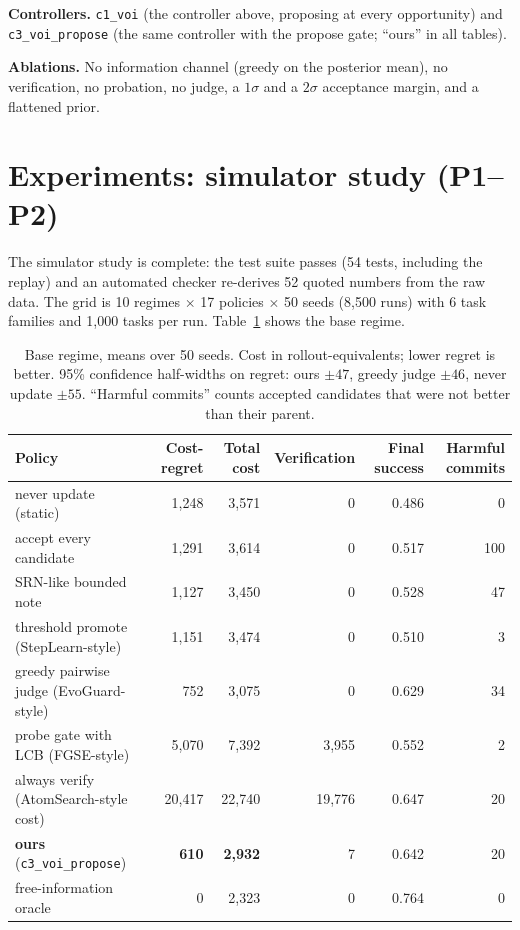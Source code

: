 \documentclass[11pt]{article}
\begin{document}
\textbf{Controllers.} \texttt{c1\_voi} (the controller above, proposing at every
opportunity) and \texttt{c3\_voi\_propose} (the same controller with the propose gate;
``ours'' in all tables).

\textbf{Ablations.} No information channel (greedy on the posterior mean), no verification,
no probation, no judge, a $1\sigma$ and a $2\sigma$ acceptance margin, and a flattened prior.

\section{Experiments: simulator study (P1--P2)}
The simulator study is complete: the test suite passes (54 tests, including the replay) and
an automated checker re-derives 52 quoted numbers from the raw data.  The grid is 10 regimes $\times$ 17 policies
$\times$ 50 seeds (8,500 runs) with 6 task families and 1,000 tasks per run.
Table~\ref{tab:main-sim} shows the base regime.

\begin{table}[!h]
\centering
\small
\begin{tabular}{lrrrrr}
\toprule
Policy & Cost-regret & Total cost & Verification & Final success & Harmful commits \\
\midrule
never update (static) & 1,248 & 3,571 & 0 & 0.486 & 0 \\
accept every candidate & 1,291 & 3,614 & 0 & 0.517 & 100 \\
SRN-like bounded note & 1,127 & 3,450 & 0 & 0.528 & 47 \\
threshold promote (StepLearn-style) & 1,151 & 3,474 & 0 & 0.510 & 3 \\
greedy pairwise judge (EvoGuard-style) & 752 & 3,075 & 0 & 0.629 & 34 \\
probe gate with LCB (FGSE-style) & 5,070 & 7,392 & 3,955 & 0.552 & 2 \\
always verify (AtomSearch-style cost) & 20,417 & 22,740 & 19,776 & 0.647 & 20 \\
\textbf{ours} (\texttt{c3\_voi\_propose}) & \textbf{610} & \textbf{2,932} & 7 & 0.642 & 20 \\
free-information oracle & 0 & 2,323 & 0 & 0.764 & 0 \\
\bottomrule
\end{tabular}
\caption{Base regime, means over 50 seeds.  Cost in rollout-equivalents; lower regret is
better.  95\% confidence half-widths on regret: ours $\pm 47$, greedy judge $\pm 46$, never
update $\pm 55$.  ``Harmful commits'' counts accepted candidates that were not better than
their parent.}
\label{tab:main-sim}
\end{table}
\end{document}
